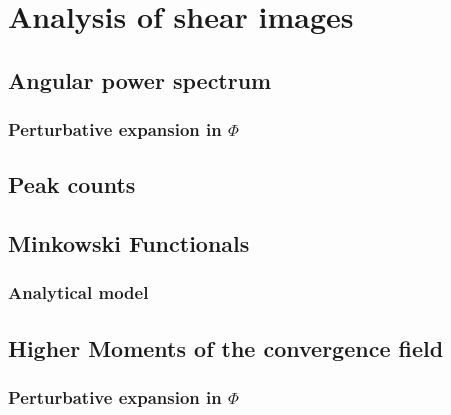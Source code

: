 
\chapter{Analysis of shear images}
\lhead[\fancyplain{}{\thepage}]{\fancyplain{}{\rightmark}}
 \thispagestyle{plain}
\setlength{\parindent}{10mm}


\section{Angular power spectrum}

\subsection{Perturbative expansion in $\Phi$}

\section{Peak counts}

\section{Minkowski Functionals}

\subsection{Analytical model}

\section{Higher Moments of the convergence field}

\subsection{Perturbative expansion in $\Phi$}

